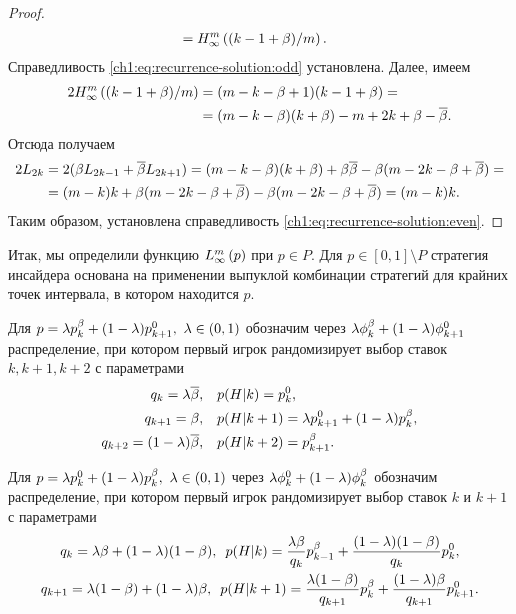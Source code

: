 {\begin{proof}
\begin{align*}
    &= \upperBound{(k-1+\Co)/m}.
  \end{align*}
  Справедливость \eqref{ch1:eq:recurrence-solution:odd} установлена.
  Далее, имеем
  \begin{align*}
    2 \upperBound{(k-1+\Co)/m} 
    &= (m-k-\Co+1)(k-1+\Co) = \\
    &= (m-k-\Co)(k+\Co) - m + 2k + \Co - \DCo.
  \end{align*}
  Отсюда получаем
  \begin{align*}
    2 L_{2k} 
    &= 2 (\Co L_{2k-1} + \DCo L_{2k+1}) = (m-k-\Co)(k+\Co) + \Co \DCo - \Co (m - 2k - \Co + \DCo) = \\
    &= (m-k)k + \Co(m-2k-\Co+\DCo) - \Co(m-2k-\Co+\DCo) = (m-k)k.
  \end{align*}
  Таким образом, установлена справедливость \eqref{ch1:eq:recurrence-solution:even}.
\end{proof}

Итак, мы определили функцию $\lowerBound{p}$ при $p \in P$.
Для $p \in [0, 1] \setminus P$ стратегия инсайдера основана на применении выпуклой комбинации стратегий для крайних точек интервала, в котором находится $p$.

Для $p = \lambda \pOdd + (1-\lambda) \pEven[k+1],\ \lambda \in (0, 1)$ обозначим через $\lambda\fOdd[k] + (1-\lambda)\fEven[k+1]$ распределение, при котором первый игрок рандомизирует выбор ставок $k, k+1, k+2$ с параметрами
\begin{align*}
  q_k = \lambda\DCo, &\quad p(H|k) = \pEven,\\
  q_{k+1} = \Co, &\quad p(H|k+1) = \lambda \pEven[k+1] + (1-\lambda) \pOdd,\\
  q_{k+2} = (1-\lambda)\DCo, &\quad p(H|k+2) = \pOdd[k+1].
\end{align*}

Для $p = \lambda \pEven + (1-\lambda) \pOdd,\ \lambda \in (0, 1)$ через $\lambda\fEven + (1-\lambda)\fOdd$ обозначим распределение, при котором первый игрок рандомизирует выбор ставок $k$ и $k+1$ с параметрами
\begin{gather*}
  q_k = \lambda\Co + (1-\lambda)(1-\Co),\enskip
  p(H|k) = \frac{\lambda\Co}{q_k}\pOdd[k-1] + \frac{(1-\lambda)(1-\Co)}{q_k} \pEven,\\
  q_{k+1} = \lambda(1-\Co) + (1-\lambda)\Co,\enskip
  p(H|k+1) = \frac{\lambda(1-\Co)}{q_{k+1}}\pOdd[k] + \frac{(1-\lambda)\Co}{q_{k+1}}\pEven[k+1].
\end{gather*}

}
